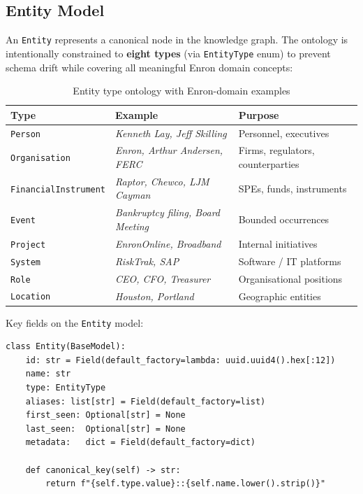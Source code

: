 \documentclass[12pt,a4paper]{article}
\begin{document}
\subsection{Entity Model}

An \texttt{Entity} represents a canonical node in the knowledge graph. The ontology is intentionally constrained to \textbf{eight types} (via \texttt{EntityType} enum) to prevent schema drift while covering all meaningful Enron domain concepts:

\begin{table}[H]
\centering
\begin{tabular}{@{}lll@{}}
\toprule
\textbf{Type} & \textbf{Example} & \textbf{Purpose} \\ \midrule
\texttt{Person} & \textit{Kenneth Lay, Jeff Skilling} & Personnel, executives \\
\texttt{Organisation} & \textit{Enron, Arthur Andersen, FERC} & Firms, regulators, counterparties \\
\texttt{FinancialInstrument} & \textit{Raptor, Chewco, LJM Cayman} & SPEs, funds, instruments \\
\texttt{Event} & \textit{Bankruptcy filing, Board Meeting} & Bounded occurrences \\
\texttt{Project} & \textit{EnronOnline, Broadband} & Internal initiatives \\
\texttt{System} & \textit{RiskTrak, SAP} & Software / IT platforms \\
\texttt{Role} & \textit{CEO, CFO, Treasurer} & Organisational positions \\
\texttt{Location} & \textit{Houston, Portland} & Geographic entities \\
\bottomrule
\end{tabular}
\caption{Entity type ontology with Enron-domain examples}
\end{table}

Key fields on the \texttt{Entity} model:

\begin{lstlisting}[caption=Entity model excerpt (schema.py)]
class Entity(BaseModel):
    id: str = Field(default_factory=lambda: uuid.uuid4().hex[:12])
    name: str
    type: EntityType
    aliases: list[str] = Field(default_factory=list)
    first_seen: Optional[str] = None
    last_seen:  Optional[str] = None
    metadata:   dict = Field(default_factory=dict)

    def canonical_key(self) -> str:
        return f"{self.type.value}::{self.name.lower().strip()}"
\end{lstlisting}
\end{document}
